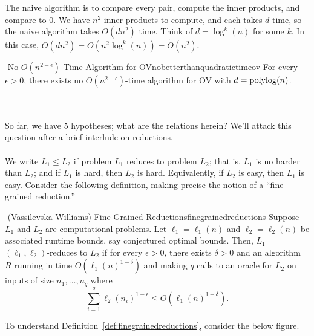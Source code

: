         \vphantom
        \\
        \\
        The naive algorithm is to compare every pair, compute the inner products, and compare to \(0\). We have \(n^2\) inner products to compute, and each takes \(d\) time, so the naive algorithm takes \(O(dn^2)\) time. Think of \(d=\log^k(n)\) for some \(k\). In this case, \(O(dn^2)=O(n^2\log^k(n))=\tilde{O}(n^2)\).
        \begin{hypothesis}{\Stop\,\,No \(O(n^{2-\epsilon})\)-Time Algorithm for \textsc{OV}}{nobetterthanquadratictimeov}
            For every \(\epsilon>0\), there exists no \(O(n^{2-\epsilon})\)-time algorithm for \textsc{OV} with \(d=\operatorname{polylog}(n)\).
        \end{hypothesis}
        \vphantom
        \\
        \\
        So far, we have \(5\) hypotheses; what are the relations herein? We'll attack this question after a brief interlude on reductions.
        \\
        \\
        We write \(L_1\leq L_2\) if problem \(L_1\) reduces to problem \(L_2\); that is, \(L_1\) is no harder than \(L_2\); and if \(L_1\) is hard, then \(L_2\) is hard. Equivalently, if \(L_2\) is easy, then \(L_1\) is easy. Consider the following definition, making precise the notion of a ``fine-grained reduction.''
        \begin{definition}{\Stop\,\,(Vassilevska Williams) Fine-Grained Reductions}{finegrainedreductions}
            Suppose \(L_1\) and \(L_2\) are computational problems. Let \(\ell_1=\ell_1(n)\) and \(\ell_2=\ell_2(n)\) be associated runtime bounds, say conjectured optimal bounds. Then, \(L_1\) \((\ell_1,\ell_2)\)-reduces to \(L_2\) if for every \(\epsilon>0\), there exists \(\delta>0\) and an algorithm \(R\) running in time \(O(\ell_1(n)^{1-\delta})\) and making \(q\) calls to an oracle for \(L_2\) on inputs of size \(n_1,\ldots,n_q\) where
            \begin{equation*}
                \sum_{i=1}^q \ell_2(n_i)^{1-\epsilon}\leq O(\ell_1(n)^{1-\delta}).
            \end{equation*}
        \end{definition}
        \begin{remark*}
            To understand Definition~\ref{def:finegrainedreductions}, consider the below figure.
        \end{remark*}
